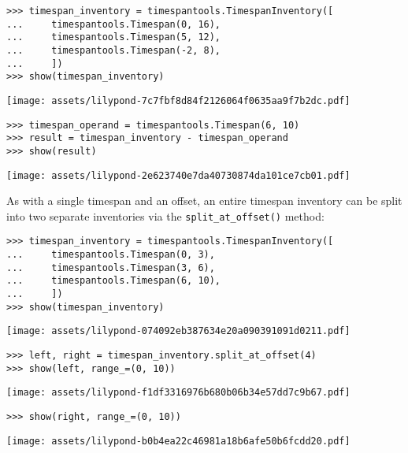 \begin{abjadbookoutput}
\begin{singlespacing}
\vspace{-0.5\baselineskip}
\begin{verbatim}
>>> timespan_inventory = timespantools.TimespanInventory([
...     timespantools.Timespan(0, 16),
...     timespantools.Timespan(5, 12),
...     timespantools.Timespan(-2, 8),
...     ])
>>> show(timespan_inventory)
\end{verbatim}
\noindent\texttt{[image: assets/lilypond-7c7fbf8d84f2126064f0635aa9f7b2dc.pdf]}
\begin{verbatim}
>>> timespan_operand = timespantools.Timespan(6, 10)
>>> result = timespan_inventory - timespan_operand
>>> show(result)
\end{verbatim}
\noindent\texttt{[image: assets/lilypond-2e623740e7da40730874da101ce7cb01.pdf]}
\end{singlespacing}
\end{abjadbookoutput}

\noindent As with a single timespan and an offset, an entire timespan inventory
can be split into two separate inventories via the \texttt{split\_at\_offset()}
method:

\begin{comment}
<abjad>
timespan_inventory = timespantools.TimespanInventory([
    timespantools.Timespan(0, 3),
    timespantools.Timespan(3, 6),
    timespantools.Timespan(6, 10),
    ])
show(timespan_inventory)
left, right = timespan_inventory.split_at_offset(4)
show(left, range_=(0, 10))
show(right, range_=(0, 10))
</abjad>
\end{comment}

\begin{abjadbookoutput}
\begin{singlespacing}
\vspace{-0.5\baselineskip}
\begin{verbatim}
>>> timespan_inventory = timespantools.TimespanInventory([
...     timespantools.Timespan(0, 3),
...     timespantools.Timespan(3, 6),
...     timespantools.Timespan(6, 10),
...     ])
>>> show(timespan_inventory)
\end{verbatim}
\noindent\texttt{[image: assets/lilypond-074092eb387634e20a090391091d0211.pdf]}
\begin{verbatim}
>>> left, right = timespan_inventory.split_at_offset(4)
>>> show(left, range_=(0, 10))
\end{verbatim}
\noindent\texttt{[image: assets/lilypond-f1df3316976b680b06b34e57dd7c9b67.pdf]}
\begin{verbatim}
>>> show(right, range_=(0, 10))
\end{verbatim}
\noindent\texttt{[image: assets/lilypond-b0b4ea22c46981a18b6afe50b6fcdd20.pdf]}
\end{singlespacing}
\end{abjadbookoutput}


